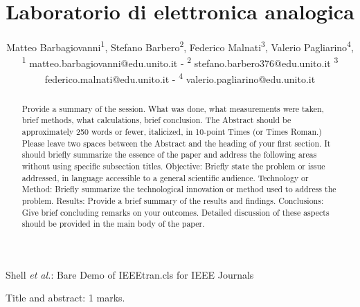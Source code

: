 \documentclass[journal]{IEEEtran}
\begin{document}
\title{Laboratorio di elettronica analogica\\ 
}

\author{\begin{center}Matteo Barbagiovanni\textsuperscript{1},
        Stefano Barbero\textsuperscript{2},
        Federico Malnati\textsuperscript{3},
        Valerio Pagliarino\textsuperscript{4},
        {\small \\
        \textsuperscript{1}
        matteo.barbagiovanni@edu.unito.it -
        \textsuperscript{2}
        stefano.barbero376@edu.unito.it
        \textsuperscript{3}
        federico.malnati@edu.unito.it -
        \textsuperscript{4}
        valerio.pagliarino@edu.unito.it}
        \end{center}}%
        
{Shell \MakeLowercase{\textit{et al.}}: Bare Demo of IEEEtran.cls for IEEE Journals}

\maketitle

\begin{flushright} Title and abstract: 1 marks. \end{flushright}
\begin{abstract} Provide a summary of the session. What was done, 
what measurements were taken, brief methods, what calculations, brief conclusion.  The Abstract should be approximately 250 words or fewer, italicized, in 10-point Times (or Times Roman.) Please leave two spaces between the Abstract and the heading of your first section.
It should briefly summarize the essence of the paper and address the following areas without using specific subsection titles. Objective: Briefly state the problem or issue addressed, in language accessible to a general scientific audience. Technology or Method: Briefly summarize the technological innovation or method used to address the problem. Results: Provide a brief summary of the results and findings. Conclusions: Give brief concluding remarks on your outcomes. Detailed discussion of these aspects should be provided in the main body of the paper. 
\end{abstract}
\end{document}
